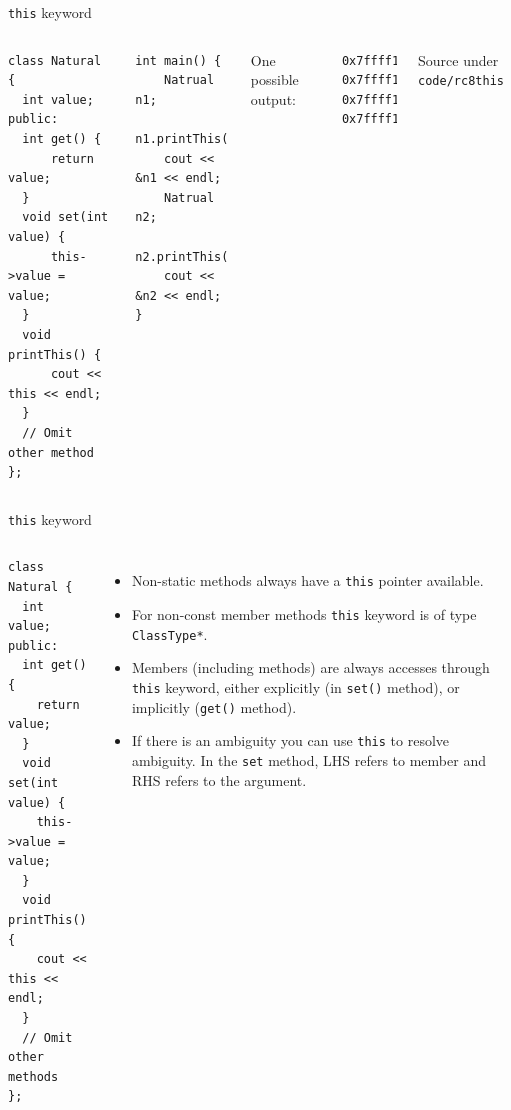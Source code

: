 \begin{frame}[fragile]{\texttt{this} keyword}
\begin{columns}[]
	
	\vspace{-.3in}
\begin{verbatim}
class Natural {
  int value;
public:
  int get() { 
      return value;
  }
  void set(int value) {
      this->value = value;
  }
  void printThis() {
      cout << this << endl;
  }
  // Omit other method
};
\end{verbatim}
	
	
	\vspace{-.3in}
\begin{verbatim}
int main() {
    Natrual n1; 
    n1.printThis(); 
    cout << &n1 << endl;
    Natrual n2; 
    n2.printThis();
    cout << &n2 << endl;
}
\end{verbatim}	

One \alert{possible} output:

\begin{verbatim}
0x7ffff1fd2820
0x7ffff1fd2820
0x7ffff1fd2830
0x7ffff1fd2830
\end{verbatim}

Source under \texttt{code/rc8this}

\end{columns}
\end{frame}

\begin{frame}[fragile]{\texttt{this} keyword}
\begin{columns}[]
	
	\vspace{-.3in}
\begin{verbatim}
class Natural {
  int value;
public:
  int get() { 
    return value;
  }
  void set(int value) {
    this->value = value;
  }
  void printThis() {
    cout << this << endl;
  }
  // Omit other methods
};
\end{verbatim}
	
	\vspace{-.2in}
	\begin{itemize}
		\item Non-static methods always have a \texttt{this} pointer available.
		\item For non-const member methods \texttt{this} keyword is of type \texttt{ClassType*}.
		\item Members (including methods) are \alert{always} accesses through \texttt{this} keyword, either explicitly (in \texttt{set()} method), or implicitly (\texttt{get()} method).
		\item If there is an ambiguity you can use \texttt{this} to resolve ambiguity. In the \texttt{set} method, LHS refers to member and RHS refers to the argument.
	\end{itemize}
\end{columns}
\end{frame}

